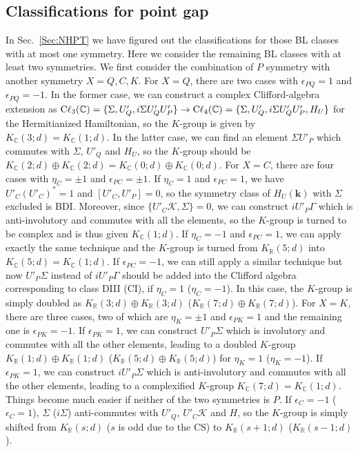 \documentclass{tADP2e}
\theoremstyle{plain}
\theoremstyle{plain}
\theoremstyle{definition}
\begin{document}
\begin{appendices}
\subsection{Classifications for point gap}\label{Sec:pgBL}
In Sec.~\ref{Sec:NHPT} we have figured out the classifications for those BL classes with at most one symmetry. Here we consider the remaining BL classes with at least two symmetries. We first consider the combination of $P$ symmetry with another symmetry $X=Q,C,K$. For $X=Q$, there are two cases with $\epsilon_{PQ}=1$ and $\epsilon_{PQ}=-1$. In the former case, we can construct a complex Clifford-algebra extension as ${\rm C}\ell_3(\mathbb{C})=\{\Sigma,U_Q',i\Sigma U'_QU'_P\}\to{\rm C}\ell_4(\mathbb{C})=\{\Sigma,U_Q',i\Sigma U'_QU'_P,H_U\}$ for the Hermitianized Hamiltonian, so the $K$-group is given by $K_{\mathbb{C}}(3;d)=K_{\mathbb{C}}(1;d)$. In the latter case, we can find an element $\Sigma U'_P$ which commutes with $\Sigma$, $U'_Q$ and $H_U$, so the $K$-group should be $K_{\mathbb{C}}(2;d)\oplus K_{\mathbb{C}}(2;d)=K_{\mathbb{C}}(0;d)\oplus K_{\mathbb{C}}(0;d)$. For $X=C$, there are four cases with $\eta_C=\pm1$ and $\epsilon_{PC}=\pm1$. If $\eta_C=1$ and $\epsilon_{PC}=1$, we have $U'_C(U'_C)^*=1$ and $[U'_C,U'_P]=0$, so the symmetry class of $H_U(\boldsymbol{k})$ with $\Sigma$ excluded is BDI. Moreover, since $\{U'_C\mathcal{K},\Sigma\}=0$, we can construct $i U'_P\Gamma$ which is anti-involutory and commutes with all the elements, so the $K$-group is turned to be complex and is thus given $K_\mathbb{C}(1;d)$. If $\eta_C=-1$ and $\epsilon_{PC}=1$, we can apply exactly the same technique and the $K$-group is turned from $K_\mathbb{R}(5;d)$ into $K_\mathbb{C}(5;d)=K_\mathbb{C}(1;d)$. If $\epsilon_{PC}=-1$, we can still apply a similar technique but now $U'_P\Sigma$ instead of $i U'_P\Gamma$ should be added into the Clifford algebra corresponding to class DIII (CI), if $\eta_C=1$ ($\eta_C=-1$). In this case, the $K$-group is simply doubled as $K_\mathbb{R}(3;d)\oplus K_\mathbb{R}(3;d)$ ($K_\mathbb{R}(7;d)\oplus K_\mathbb{R}(7;d)$). For $X=K$, there are three cases, two of which are $\eta_K=\pm1$ and $\epsilon_{PK}=1$ and the remaining one is $\epsilon_{PK}=-1$. If $\epsilon_{PK}=1$, we can construct $U'_P\Sigma$ which is involutory and commutes with all the other elements, leading to a doubled $K$-group $K_\mathbb{R}(1;d)\oplus K_\mathbb{R}(1;d)$ ($K_\mathbb{R}(5;d)\oplus K_\mathbb{R}(5;d)$) for $\eta_K=1$ ($\eta_K=-1$). If $\epsilon_{PK}=1$, we can construct $iU'_P\Sigma$ which is anti-involutory and commutes with all the other elements, leading to a complexified $K$-group $K_\mathbb{C}(7;d)=K_\mathbb{C}(1;d)$. Things become much easier if neither of the two symmetries is $P$. If $\epsilon_C=-1$ ($\epsilon_C=1$), $\Sigma$ ($i\Sigma$) anti-commutes with $U'_Q$, $U'_C\mathcal{K}$ and $H$, so the $K$-group is simply shifted from $K_{\mathbb{R}}(s;d)$ ($s$ is odd due to the CS) to $K_{\mathbb{R}}(s+1;d)$ ($K_{\mathbb{R}}(s-1;d)$).


\end{appendices}
\end{document}
